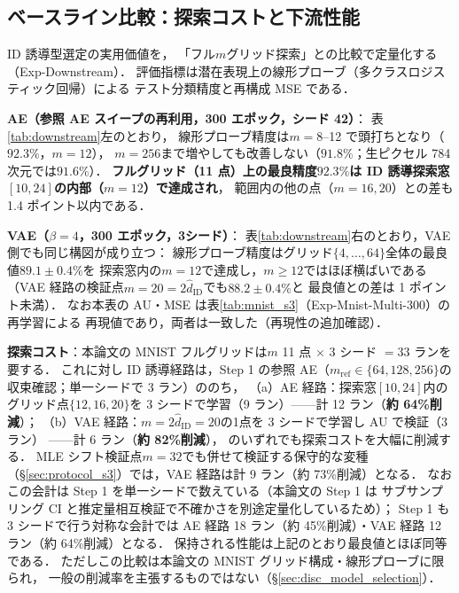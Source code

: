 \documentclass[11pt,a4paper]{jsarticle}
\newcommand{\hatdID}{\hat{d}_{\mathrm{ID}}}
\begin{document}
\subsection{ベースライン比較：探索コストと下流性能}\label{sec:exp_downstream}

ID 誘導型選定の実用価値を，
「フル$m$グリッド探索」との比較で定量化する（Exp-Downstream）．
評価指標は潜在表現上の線形プローブ（多クラスロジスティック回帰）による
テスト分類精度と再構成 MSE である．

\textbf{AE（参照 AE スイープの再利用，300 エポック，シード 42）}：
表\ref{tab:downstream}左のとおり，
線形プローブ精度は$m = 8$--12 で頭打ちとなり（$92.3\%$，$m = 12$），
$m = 256$まで増やしても改善しない（$91.8\%$；生ピクセル 784 次元では$91.6\%$）．
\textbf{フルグリッド（11 点）上の最良精度$92.3\%$は
ID 誘導探索窓$[10, 24]$の内部（$m = 12$）で達成され}，
範囲内の他の点（$m = 16, 20$）との差も 1.4 ポイント以内である．

\textbf{VAE（$\beta = 4$，300 エポック，3シード）}：
表\ref{tab:downstream}右のとおり，VAE 側でも同じ構図が成り立つ：
線形プローブ精度はグリッド$\{4, \ldots, 64\}$全体の最良値$89.1 \pm 0.4\%$を
探索窓内の$m = 12$で達成し，$m \geq 12$ではほぼ横ばいである
（VAE 経路の検証点$m = 20 = 2\hatdID$でも$88.2 \pm 0.4\%$と
最良値との差は 1 ポイント未満）．
なお本表の AU・MSE は表\ref{tab:mnist_s3}（Exp-Mnist-Multi-300）の再学習による
再現値であり，両者は一致した（再現性の追加確認）．

\textbf{探索コスト}：本論文の MNIST フルグリッドは$m$ 11 点
$\times$ 3 シード $= 33$ ランを要する．
これに対し ID 誘導経路は，Step 1 の参照 AE（$m_{\mathrm{ref}} \in \{64, 128, 256\}$の
収束確認；単一シードで 3 ラン）ののち，
（a）AE 経路：探索窓$[10, 24]$内のグリッド点$\{12, 16, 20\}$を
3 シードで学習（9 ラン）——計 12 ラン（\textbf{約 64\%削減}）；
（b）VAE 経路：$m = 2\hatdID = 20$の1点を 3 シードで学習し AU で検証（3 ラン）
——計 6 ラン（\textbf{約 82\%削減}），
のいずれでも探索コストを大幅に削減する．
MLE シフト検証点$m = 32$でも併せて検証する保守的な変種
（§\ref{sec:protocol_s3}）では，VAE 経路は計 9 ラン（約 73\%削減）となる．
なおこの会計は Step 1 を単一シードで数えている（本論文の Step 1 は
サブサンプリング CI と推定量相互検証で不確かさを別途定量化しているため）；
Step 1 も 3 シードで行う対称な会計では
AE 経路 18 ラン（約 45\%削減）・VAE 経路 12 ラン（約 64\%削減）となる．
保持される性能は上記のとおり最良値とほぼ同等である．
ただしこの比較は本論文の MNIST グリッド構成・線形プローブに限られ，
一般の削減率を主張するものではない（§\ref{sec:disc_model_selection}）．
\end{document}
